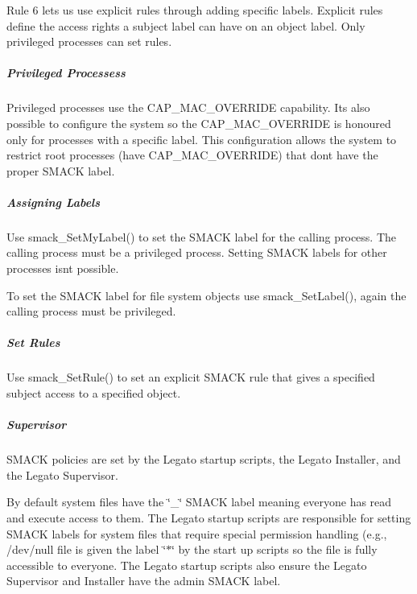 Rule 6 lets us use explicit rules through adding specific labels. Explicit rules define the access rights a subject label can have on an object label. Only privileged processes can set rules.\hypertarget{basic_security_smack_advanced_c_smack_privProcess}{}\subparagraph{Privileged Processess}\label{basic_security_smack_advanced_c_smack_privProcess}
Privileged processes use the C\+A\+P\+\_\+\+M\+A\+C\+\_\+\+O\+V\+E\+R\+R\+I\+D\+E capability. It\textquotesingle{}s also possible to configure the system so the C\+A\+P\+\_\+\+M\+A\+C\+\_\+\+O\+V\+E\+R\+R\+I\+D\+E is honoured only for processes with a specific label. This configuration allows the system to restrict root processes (have C\+A\+P\+\_\+\+M\+A\+C\+\_\+\+O\+V\+E\+R\+R\+I\+D\+E) that don\textquotesingle{}t have the proper S\+M\+A\+C\+K label.\hypertarget{basic_security_smack_advanced_c_smack_assignLabels}{}\subparagraph{Assigning Labels}\label{basic_security_smack_advanced_c_smack_assignLabels}
Use smack\+\_\+\+Set\+My\+Label() to set the S\+M\+A\+C\+K label for the calling process. The calling process must be a privileged process. Setting S\+M\+A\+C\+K labels for other processes isn\textquotesingle{}t possible.

To set the S\+M\+A\+C\+K label for file system objects use smack\+\_\+\+Set\+Label(), again the calling process must be privileged.\hypertarget{basic_security_smack_advanced_basicSecuritySmackAdvanced_setRules}{}\subparagraph{Set Rules}\label{basic_security_smack_advanced_basicSecuritySmackAdvanced_setRules}
Use smack\+\_\+\+Set\+Rule() to set an explicit S\+M\+A\+C\+K rule that gives a specified subject access to a specified object.\hypertarget{basic_security_smack_advanced_basicSecuritySmackAdvanced_supervisor}{}\subparagraph{Supervisor}\label{basic_security_smack_advanced_basicSecuritySmackAdvanced_supervisor}
S\+M\+A\+C\+K policies are set by the Legato startup scripts, the Legato Installer, and the Legato Supervisor.

By default system files have the \char`\"{}\+\_\+\char`\"{} S\+M\+A\+C\+K label meaning everyone has read and execute access to them. The Legato startup scripts are responsible for setting S\+M\+A\+C\+K labels for system files that require special permission handling (e.\+g., {\ttfamily /dev/null} file is given the label \char`\"{}$\ast$\char`\"{} by the start up scripts so the file is fully accessible to everyone. The Legato startup scripts also ensure the Legato Supervisor and Installer have the \textquotesingle{}admin\textquotesingle{} S\+M\+A\+C\+K label.

